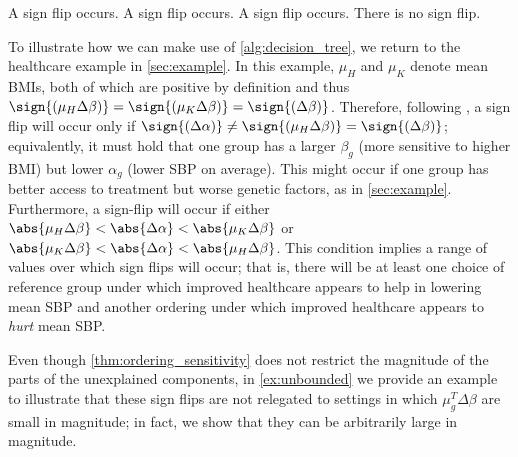 \begin{algorithm}[H]
    \caption{Unexplained component sign-flip}
    \label{alg:decision_tree}
\begin{algorithmic}  
                    \State A sign flip occurs.
                \EndIf
            \EndIf
                \State A sign flip occurs.
                \State A sign flip occurs.
            \EndIf
        \EndIf
    \Else
        \State There is no sign flip.
    \EndIf
\end{algorithmic}
\end{algorithm}

To illustrate how we can make use of \cref{alg:decision_tree}, we return to the healthcare example in \cref{sec:example}.
In this example, $\mu_H$ and $\mu_K$ denote mean BMIs, both of which are positive by definition and thus $\sign{(\mu_H \Delta\beta)} = \sign{(\mu_K \Delta\beta)} = \sign{(\Delta\beta)}$. Therefore, following , a sign flip will occur only if $\sign{(\Delta\alpha)} \neq \sign{(\mu_H \Delta\beta)} = \sign{(\Delta\beta)}$; equivalently, it must hold that one group has a larger $\beta_g$ (more sensitive to higher BMI) but lower $\alpha_g$ (lower SBP on average).
This might occur if one group has better access to treatment but worse genetic factors, as in \cref{sec:example}.
Furthermore, a sign-flip will occur if either $\abs{\mu_H \Delta\beta} < \abs{\Delta\alpha} < \abs{\mu_K \Delta\beta}$ or $\abs{\mu_K \Delta\beta} < \abs{\Delta\alpha} < \abs{\mu_H \Delta\beta}$. This condition implies a range of values over which sign flips will occur; that is, there will be at least one choice of reference group under which improved healthcare appears to help in lowering mean SBP and another ordering under which improved healthcare appears to \emph{hurt} mean SBP.

Even though \cref{thm:ordering_sensitivity} does not restrict the magnitude of the parts of the unexplained components, in \cref{ex:unbounded} we provide an example to illustrate that these sign flips are not relegated to settings in which $\mu_g^T\Delta\beta$ are small in magnitude; in fact, we show that they can be arbitrarily large in magnitude.

